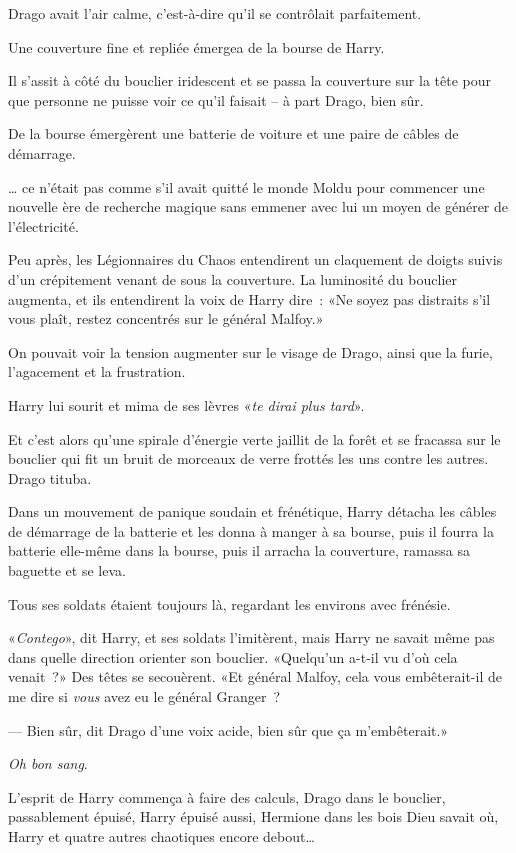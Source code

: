 Drago avait l'air calme, c'est-à-dire qu'il se contrôlait parfaitement.

Une couverture fine et repliée émergea de la bourse de Harry.

Il s'assit à côté du bouclier iridescent et se passa la couverture sur la tête pour que personne ne puisse voir ce qu'il faisait -- à part Drago, bien sûr.

De la bourse émergèrent une batterie de voiture et une paire de câbles de démarrage.

… ce n'était pas comme s'il avait quitté le monde Moldu pour commencer une nouvelle ère de recherche magique sans emmener avec lui un moyen de générer de l'électricité.

Peu après, les Légionnaires du Chaos entendirent un claquement de doigts suivis d'un crépitement venant de sous la couverture. La luminosité du bouclier augmenta, et ils entendirent la voix de Harry dire~: «Ne soyez pas distraits s'il vous plaît, restez concentrés sur le général Malfoy.»

On pouvait voir la tension augmenter sur le visage de Drago, ainsi que la furie, l'agacement et la frustration.

Harry lui sourit et mima de ses lèvres «\emph{te dirai plus tard}».

Et c'est alors qu'une spirale d'énergie verte jaillit de la forêt et se fracassa sur le bouclier qui fit un bruit de morceaux de verre frottés les uns contre les autres. Drago tituba.

Dans un mouvement de panique soudain et frénétique, Harry détacha les câbles de démarrage de la batterie et les donna à manger à sa bourse, puis il fourra la batterie elle-même dans la bourse, puis il arracha la couverture, ramassa sa baguette et se leva.

Tous ses soldats étaient toujours là, regardant les environs avec frénésie.

«\emph{Contego}», dit Harry, et ses soldats l'imitèrent, mais Harry ne savait même pas dans quelle direction orienter son bouclier. «Quelqu'un a-t-il vu d'où cela venait~?» Des têtes se secouèrent. «Et général Malfoy, cela vous embêterait-il de me dire si \emph{vous} avez eu le général Granger~?

--- Bien sûr, dit Drago d'une voix acide, bien sûr que ça m'embêterait.»

\emph{Oh bon sang}.

L'esprit de Harry commença à faire des calculs, Drago dans le bouclier, passablement épuisé, Harry épuisé aussi, Hermione dans les bois Dieu savait où, Harry et quatre autres chaotiques encore debout…

